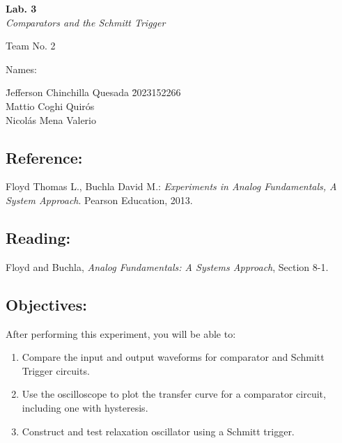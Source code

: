 \documentclass[11pt]{article}
\begin{document}
\begin{center}
    {\LARGE \bfseries Lab. 3}\\[0.3em]
    {\Large \itshape Comparators and the Schmitt Trigger}
\end{center}

\vspace{1em}

\noindent Team No. 2

\vspace{0.5em}

\noindent Names:

\begin{tabbing}
\hspace{1cm} \= Jefferson Chinchilla Quesada \hspace{0.3cm} \= 2023152266  \\[0.6cm]
\> Mattio Coghi Quirós  \\[0.6cm]
\> Nicolás Mena Valerio 
\end{tabbing}

\vspace{1em}
\vspace{1em}

\subsection*{Reference:}
Floyd Thomas L., Buchla David M.: \textit{Experiments in Analog Fundamentals, A System Approach}. Pearson Education, 2013.

\subsection*{Reading:}
Floyd and Buchla, \textit{Analog Fundamentals: A Systems Approach}, Section 8-1.

\subsection*{Objectives:}
After performing this experiment, you will be able to:
\begin{enumerate}[label=\arabic*.]
    \item Compare the input and output waveforms for comparator and Schmitt Trigger circuits.
    \item Use the oscilloscope to plot the transfer curve for a comparator circuit, including one with hysteresis.
    \item Construct and test relaxation oscillator using a Schmitt trigger.
\end{enumerate}
\end{document}
